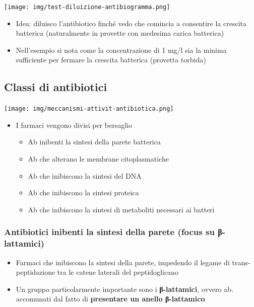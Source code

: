 \documentclass[italian,]{article}
\providecommand{\tightlist}{%
  \setlength{\itemsep}{0pt}\setlength{\parskip}{0pt}}
\newcommand{\asidefigure}[2]{\marginpar{\phantom{Img:}\newline\texttt{[image: \#1]}\\\footnotesize\emph{#2}}}
\begin{document}
\texttt{[image: img/test-diluizione-antibiogramma.png]}~

\begin{itemize}
\tightlist
\item
  Idea: diluisco l'antibiotico finché vedo che comincia a consentire la
  crescita batterica (naturalmente in provette con medesima carica
  batterica)
\item
  Nell'esempio si nota come la concentrazione di 1 mg/l sia la minima
  sufficiente per fermare la crescita batterica (provetta torbida)
\end{itemize}

\hypertarget{classi-di-antibiotici}{%
\subsection{Classi di antibiotici}\label{classi-di-antibiotici}}

\texttt{[image: img/meccanismi-attivit-antibiotica.png]}~

\begin{itemize}
\tightlist
\item
  I farmaci vengono divisi per bersaglio

  \begin{itemize}
  \tightlist
  \item
    Ab inibenti la sintesi della parete batterica
  \item
    Ab che alterano le membrane citoplasmatiche
  \item
    Ab che inibiscono la sintesi del DNA
  \item
    Ab che inibiscono la sintesi proteica
  \item
    Ab che inibiscono la sintesi di metaboliti necessari ai batteri
  \end{itemize}
\end{itemize}

\hypertarget{antibiotici-inibenti-la-sintesi-della-parete-focus-su-ux3b2-lattamici}{%
\subsubsection{Antibiotici inibenti la sintesi della parete (focus su
β-lattamici)}\label{antibiotici-inibenti-la-sintesi-della-parete-focus-su-ux3b2-lattamici}}

\begin{itemize}
\tightlist
\item
  Farmaci che inibiscono la sintesi della parete, impedendo il legame di
  trans-peptidazione tra le catene laterali del peptidoglicano
\item
  Un gruppo particolarmente importante sono i \textbf{β-lattamici},
  ovvero ab. accomunati dal fatto di \textbf{presentare un anello
  β-lattamico} \asidefigure{img/beta-lattame.png}{Anello β-lattamico.}
\end{itemize}
\end{document}
